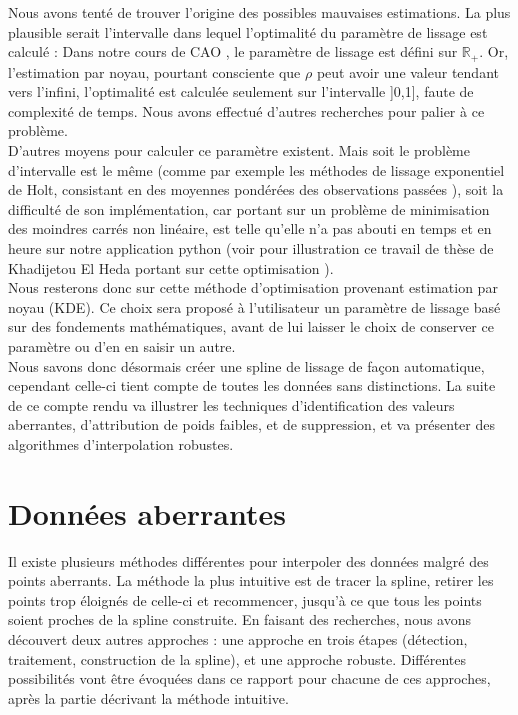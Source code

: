 \documentclass[a4paper,12pt]{article} %
\begin{document}
    
                Nous avons tenté de trouver l'origine des possibles mauvaises estimations. La plus plausible serait l'intervalle dans lequel l'optimalité du paramètre de lissage est calculé : Dans notre cours de CAO \cite{CAO_lissage}, le paramètre de lissage est défini sur $\mathds{R}_{+}$. Or, l'estimation par noyau, pourtant consciente que $\rho$ peut avoir une valeur tendant vers l'infini, l'optimalité est calculée seulement sur l'intervalle ]0,1], faute de complexité de temps. Nous avons effectué d'autres recherches pour palier à ce problème. \\
                D'autres moyens pour calculer ce paramètre existent. Mais soit le problème d'intervalle est le même (comme par exemple les méthodes de lissage exponentiel de Holt, consistant en des moyennes pondérées des observations passées \cite{Param_lissage}), soit la difficulté de son implémentation, car portant sur un problème de minimisation des moindres carrés non linéaire, est telle qu'elle n'a pas abouti en temps et en heure sur notre application python (voir pour illustration ce travail de thèse de Khadijetou El Heda portant sur cette optimisation \cite{Exemple_these}). \\
            
                Nous resterons donc sur cette méthode d'optimisation provenant estimation par noyau (KDE). 
                Ce choix sera proposé à l'utilisateur un paramètre de lissage basé sur des fondements mathématiques, avant de lui laisser le choix  de conserver ce paramètre ou d'en en saisir un autre.\\
                
                 
                Nous savons donc désormais créer une spline de lissage de façon automatique, cependant celle-ci tient compte de toutes les données sans distinctions. La suite de ce compte rendu va illustrer les techniques d'identification des valeurs aberrantes, d'attribution de poids faibles, et de suppression, et va présenter des algorithmes d'interpolation robustes.


	\section{Données aberrantes}

        Il existe plusieurs méthodes différentes pour interpoler des données malgré des points aberrants. La méthode la plus intuitive est de tracer la spline, retirer les points trop éloignés de celle-ci et recommencer, jusqu'à ce que tous les points soient proches de la spline construite. En faisant des recherches, nous avons découvert deux autres approches : une approche en trois étapes (détection, traitement, construction de la spline), et une approche robuste. Différentes possibilités vont être évoquées dans ce rapport pour chacune de ces approches, après la partie décrivant la méthode intuitive.
            
\end{document}
